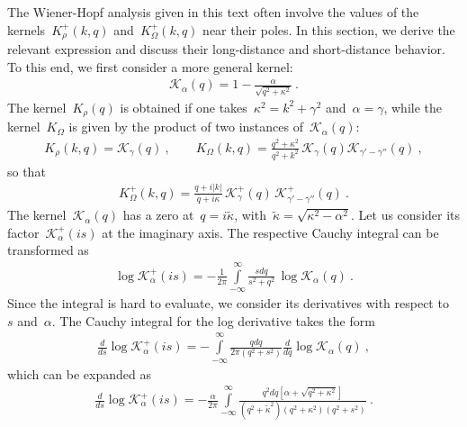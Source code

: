 \documentclass[preprint,aps,eqsecnum, prb]{revtex4-1}
\newcommand{\fplus}[1]{{#1}^{+}}
\begin{document}
The Wiener-Hopf analysis given in this text often involve the
values of the kernels~$\fplus{K}_\rho(k, q)$ and~$\fplus{K}_\Omega(k, q)$ near
their poles. In this section, we derive the relevant expression
and discuss their long-distance and short-distance behavior.
To this end, we first consider a more general kernel:
\begin{align}
  \mathcal{K}_\alpha(q) = 1 - \frac{\alpha}{\sqrt{q^2 + \kappa^2}}\ .
\end{align}
The kernel~$K_\rho(q)$ is obtained if one takes~$\kappa^2 = k^2 + \gamma^2$
and~$\alpha = \gamma$, while the kernel~$K_\Omega$ is given by
the product of two instances of~$\mathcal{K}_\alpha(q)$:
\begin{align}
  \label{eq:appA-representation}
  K_\rho(k, q) = \mathcal{K}_\gamma(q)\ , \qquad
  K_\Omega(k, q) = \frac{q^2 + \kappa^2}{q^2 + k^2}\,
 \mathcal{K}_{\gamma}(q) \mathcal{K}_{\gamma' - \gamma''}(q)\ ,
\end{align}
so that
\begin{align}
  \fplus{K}_\Omega(k, q) = \frac{q + i|k|}{q + i \kappa}\,
  \fplus{\mathcal{K}}_\gamma(q)\,
  \fplus{\mathcal{K}}_{\gamma' - \gamma''}(q)\ .
\end{align}
The kernel~$\mathcal{K}_\alpha(q)$ has a zero at~$q = i {\tilde \kappa}$,
with~${\tilde \kappa} = \sqrt{\kappa^2 - \alpha^2}$.
Let us consider its factor~$\fplus{\mathcal{K}}_\alpha(is)$
at the imaginary axis.
The respective Cauchy integral can be transformed as
\begin{align}
  \log \fplus{\mathcal{K}}_{\alpha}(is) = - \frac{1}{2\pi}
  \int\limits_{-\infty}^{\infty}
  \frac{s dq}{s^2 + q^2} \, \log \mathcal{K}_{\alpha}(q)\ .
\end{align}
Since the integral is hard to evaluate, we consider its derivatives
with respect to~$s$ and~$\alpha$.
The Cauchy integral for the log derivative takes the form
\begin{align}
  \frac{d}{ds} \log \fplus{\mathcal{K}}_{\alpha}(is)
  = -\int\limits_{-\infty}^{\infty} \frac{qdq}{2\pi (q^2 + s^2)}
  \frac{d}{dq} \log \mathcal{K}_\alpha(q)\ ,
\end{align}
which can be expanded as
\begin{align}
  \frac{d}{ds} \log \fplus{\mathcal{K}}_{\alpha}(is)
  = - \frac{\alpha}{2\pi}
  \int\limits_{-\infty}^{\infty}
  \frac{q^2 dq \left[\alpha + \sqrt{q^2 + \kappa^2}\right]}{
     (q^2 + {\tilde \kappa}^2) (q^2 + \kappa^2) (q^2 + s^2)
  }\ .
\end{align}
\end{document}
